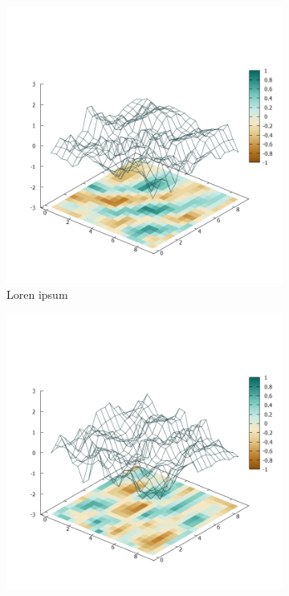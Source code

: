 \begin{figure}[ht!]
        \centering
        \begin{subfigure}[b]{0.3\textwidth}
            \centering
            \includegraphics[width=\textwidth]{img/Plate0_A1.png}
            \caption[lorem]{Loren ipsum}
            \label{fig:Plate0_A1}
        \end{subfigure}%
        \begin{subfigure}[b]{0.3\textwidth}
            \centering
            \includegraphics[width=\textwidth]{img/Plate0_A2.png}

\end{subfigure}
\end{figure}
